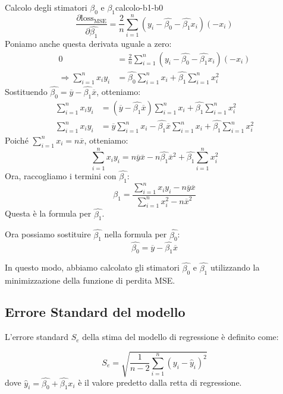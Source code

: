 \begin{dimostrazione}{Calcolo degli stimatori \( \beta_0 \) e \( \beta_1 \)}{calcolo-b1-b0}
\[
    \frac{\partial \text{loss}_{\text{MSE}}}{\partial \hat{\beta_1}} = \frac{2}{n} \sum_{i=1}^n \left( y_i - \hat{\beta_0} - \hat{\beta_1} x_i \right) (-x_i)
\]
Poniamo anche questa derivata uguale a zero:
\begin{align*}
    0 &= \frac{2}{n} \sum_{i=1}^n \left( y_i - \hat{\beta_0} - \hat{\beta_1} x_i \right) (-x_i)\\
    \Rightarrow \sum_{i=1}^n x_i y_i &= \hat{\beta_0} \sum_{i=1}^n x_i + \hat{\beta_1} \sum_{i=1}^n x_i^2
\end{align*}
Sostituendo \( \hat{\beta_0} = \overline{y} - \hat{\beta_1} \overline{x} \), otteniamo:
\begin{align*}
    \sum_{i=1}^n x_i y_i &= \left( \overline{y} - \hat{\beta_1} \overline{x} \right) \sum_{i=1}^n x_i + \hat{\beta_1} \sum_{i=1}^n x_i^2 \\
    \sum_{i=1}^n x_i y_i &= \overline{y} \sum_{i=1}^n x_i - \hat{\beta_1} \overline{x} \sum_{i=1}^n x_i + \hat{\beta_1} \sum_{i=1}^n x_i^2
\end{align*}
Poiché \( \sum_{i=1}^n x_i = n \overline{x} \), otteniamo:
\[
\sum_{i=1}^n x_i y_i = n \overline{y} \overline{x} - n \hat{\beta_1} \overline{x}^2 + \hat{\beta_1} \sum_{i=1}^n x_i^2
\]
Ora, raccogliamo i termini con \( \hat{\beta_1} \):
\[
\hat{\beta_1} = \frac{\sum_{i=1}^n x_i y_i - n \overline{y} \overline{x}}{\sum_{i=1}^n x_i^2 - n \overline{x}^2}
\]
Questa è la formula per \( \hat{\beta_1} \).

Ora possiamo sostituire \( \hat{\beta_1} \) nella formula per \( \hat{\beta_0} \):
\[
\hat{\beta_0} = \overline{y} - \hat{\beta_1} \overline{x}
\]

In questo modo, abbiamo calcolato gli stimatori \( \hat{\beta_0} \) e \( \hat{\beta_1} \) utilizzando la minimizzazione della funzione di perdita MSE.

\end{dimostrazione}


\subsection{Errore Standard del modello}

L'errore standard \( S_e \) della stima del modello di regressione è definito come:

\[
S_e = \sqrt{\frac{1}{n-2} \sum_{i=1}^n (y_i - \hat{y}_i)^2}
\]
dove \( \hat{y}_i = \hat{\beta_0} + \hat{\beta_1} x_i \) è il valore predetto dalla retta di regressione.



